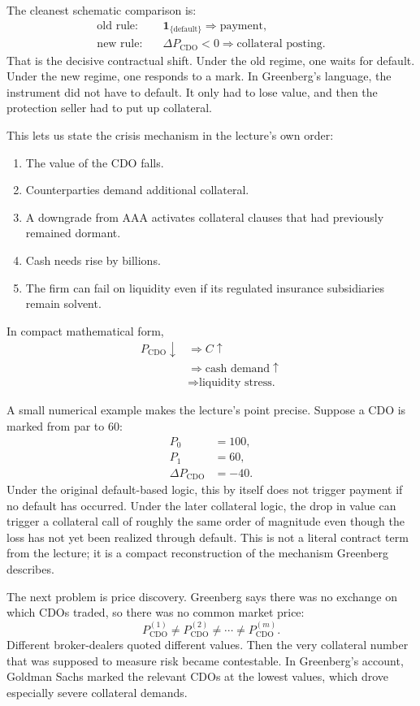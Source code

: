 The cleanest schematic comparison is:
\begin{align}
\text{old rule:} \quad & \mathbf{1}_{\{\text{default}\}} \Rightarrow \text{payment},\\
\text{new rule:} \quad & \Delta P_{\mathrm{CDO}} < 0 \Rightarrow \text{collateral posting}.
\end{align}
That is the decisive contractual shift. Under the old regime, one waits for default. Under the new regime, one responds to a mark. In Greenberg's language, the instrument did not have to default. It only had to lose value, and then the protection seller had to put up collateral.

This lets us state the crisis mechanism in the lecture's own order:
\begin{enumerate}
\item The value of the CDO falls.
\item Counterparties demand additional collateral.
\item A downgrade from AAA activates collateral clauses that had previously remained dormant.
\item Cash needs rise by billions.
\item The firm can fail on liquidity even if its regulated insurance subsidiaries remain solvent.
\end{enumerate}
In compact mathematical form,
\begin{align}
P_{\mathrm{CDO}} \downarrow
&\Rightarrow C \uparrow \\
&\Rightarrow \text{cash demand} \uparrow \\
&\Rightarrow \text{liquidity stress.}
\end{align}

A small numerical example makes the lecture's point precise. Suppose a CDO is marked from par to \(60\):
\begin{align}
P_0 &= 100,\\
P_1 &= 60,\\
\Delta P_{\mathrm{CDO}} &= -40.
\end{align}
Under the original default-based logic, this by itself does not trigger payment if no default has occurred. Under the later collateral logic, the drop in value can trigger a collateral call of roughly the same order of magnitude even though the loss has not yet been realized through default. This is not a literal contract term from the lecture; it is a compact reconstruction of the mechanism Greenberg describes.

The next problem is price discovery. Greenberg says there was no exchange on which CDOs traded, so there was no common market price:
\begin{equation}
P_{\mathrm{CDO}}^{(1)} \neq P_{\mathrm{CDO}}^{(2)} \neq \cdots \neq P_{\mathrm{CDO}}^{(m)}.
\end{equation}
Different broker-dealers quoted different values. Then the very collateral number that was supposed to measure risk became contestable. In Greenberg's account, Goldman Sachs marked the relevant CDOs at the lowest values, which drove especially severe collateral demands.

